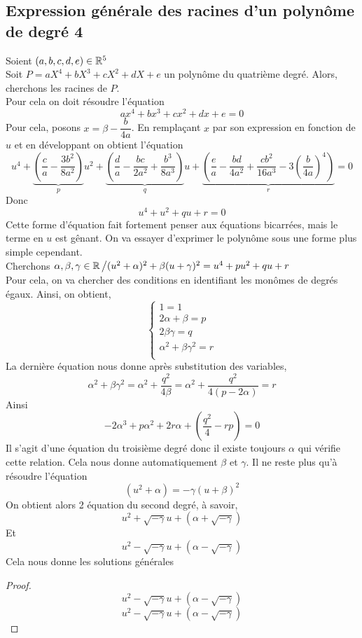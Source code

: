 \documentclass{fancybook}
\begin{document}
\subsection{Expression générale des racines d'un polynôme de degré 4}
Soient $(a,b,c,d,e)\in\mathbb{R}^5$\\
Soit $P = aX^4+bX^3+cX^2+dX+e$ un polynôme du quatrième degré. Alors, cherchons les racines de $P$.\\ 
Pour cela on doit résoudre l'équation 
\[ax^4+bx^3+cx^2+dx+e=0\]
Pour cela, posons $x = \beta - \dfrac{b}{4a}$. En remplaçant $x$ par son expression en fonction de $u$ et en développant on obtient l'équation
\[
u^4+\underbrace{\left(\dfrac{c}{a}-\dfrac{3b^2}{8a^2}\right)}_{p}u^2 + \underbrace{\left(\dfrac{d}{a}-\dfrac{bc}{2a^2}+\dfrac{b^3}{8a^3}\right)}_{q}u + \underbrace{\left(\dfrac{e}{a}-\dfrac{bd}{4a^2}+\dfrac{c b^2}{16a^3}-3\left(\dfrac{b}{4a}\right)^4\right)}_{r}= 0
\]
Donc 
\[
u^4+u^2+qu+r=0
\]
Cette forme d'équation fait fortement penser aux équations bicarrées, mais le terme en $u$ est gênant. On va essayer d'exprimer le polynôme sous une forme plus simple cependant.\\
Cherchons $\alpha, \beta, \gamma \in \mathbb{R} \left/(u^2+\alpha)^2+\beta (u+\gamma)^2=u^4+pu^2+qu+r\right.$\\
Pour cela, on va chercher des conditions en identifiant les monômes de degrés égaux. Ainsi, on obtient, 
\[
\left\{\begin{array}{l}
1=1\\
2\alpha+\beta = p\\
2 \beta \gamma = q\\
\alpha^2+\beta \gamma^2 = r\\
\end{array}\right.
\] 
La dernière équation nous donne après substitution des variables,
\[
\alpha^2+\beta \gamma^2=\alpha^2 + \dfrac{q^2}{4\beta}=\alpha^2 + \dfrac{q^2}{4(p-2\alpha)}=r
\]
Ainsi 
\[
-2\alpha^3+p\alpha^2+2r\alpha+\left(\dfrac{q^2}{4}-rp\right)=0
\]
Il s'agit d'une équation du troisième degré donc il existe toujours $\alpha$ qui vérifie cette relation. Cela nous donne automatiquement $\beta$ et $\gamma$. Il ne reste plus qu'à résoudre l'équation 
\[
(u^2+\alpha)=-\gamma(u+\beta)^2
\]
On obtient alors 2 équation du second degré, à savoir,
\[
u^2 + \sqrt{-\gamma}u + \left(\alpha + \sqrt{-\gamma}\right)
\]
Et
\[
u^2 - \sqrt{-\gamma}u + \left(\alpha - \sqrt{-\gamma}\right)
\]
Cela nous donne les solutions générales
\begin{proof}
\begin{equation}
u^2 - \sqrt{-\gamma}u + \left(\alpha - \sqrt{-\gamma}\right)
\end{equation}
\begin{equation}
u^2 - \sqrt{-\gamma}u + \left(\alpha - \sqrt{-\gamma}\right)
\end{equation}
\end{proof}
\end{document}
